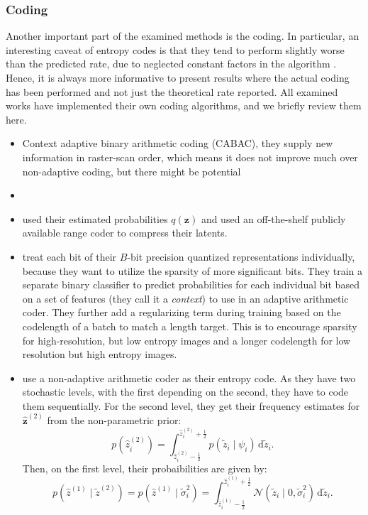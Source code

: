 \documentclass{article}
\renewcommand{\vec}[1]{\mathbf{#1}}
\renewcommand{\d}{\,\text{d}}
\newcommand{\Norm}[1]{\mathcal{N}\left( #1 \right)}
\begin{document}
\subsubsection{Coding}
\par
Another important part of the examined methods is the coding. In particular, an
interesting caveat of entropy codes is that they tend to perform slightly worse
than the predicted rate, due to neglected constant factors in the algorithm
\cite{rissanen1981universal}. Hence, it is always more informative to present
results where the actual coding has been performed and not just the theoretical
rate reported. All examined works have implemented their own coding algorithms,
and we briefly review them here.
\begin{itemize}
\item \cite{balle2016end} Context adaptive binary arithmetic coding (CABAC),
  they supply new information in raster-scan order, which means it does not
  improve much over non-adaptive coding, but there might be potential
\item \cite{toderici2017full}
\item \cite{theis2017lossy} used their estimated probabilities $q(\vec{z})$ and
  used an off-the-shelf publicly available range coder to compress their latents.
\item \cite{rippel2017real} treat each bit of their $B$-bit precision quantized
  representations individually, because they want to utilize the sparsity of
  more significant bits. They train a separate binary classifier to predict
  probabilities for each individual bit based on a set of features (they call
  it a \textit{context}) to use in an adaptive arithmetic coder. They further
  add a regularizing term during training based on the codelength of a batch to
  match a length target. This is to encourage sparsity for high-resolution, but
  low entropy images and a longer codelength for low resolution but high entropy
  images.
\item \cite{balle2018variational} use a non-adaptive arithmetic coder as their
  entropy code. As they have two stochastic levels, with the
  first depending on the second, they have to code them sequentially. For the
  second level, they get their frequency estimates for $\vec{\hat{z}}^{(2)}$
  from the non-parametric prior:
  \[
    p(\hat{z}^{(2)}_i) =
    \int_{\hat{z}^{(2)}_i-\frac{1}{2}}^{\hat{z}^{(2)}_i+\frac{1}{2}}p(\tilde{z}_i \mid \psi_i) \d \tilde{z}_i.
  \]
  Then, on the first level, their probaibilities are given by:
  \[
    p(\hat{z}^{(1)} \mid \tilde{z}^{(2)}) = p(\hat{z}^{(1)} \mid
    \tilde{\sigma}^2_i) = 
    \int_{\hat{z}^{(1)}_i-\frac{1}{2}}^{\hat{z}^{(1)}_i + \frac{1}{2}}\Norm{\tilde{z}_i \mid 0, \tilde{\sigma}^2_i} \d \tilde{z}_i.
  \]

\end{itemize}
\end{document}
